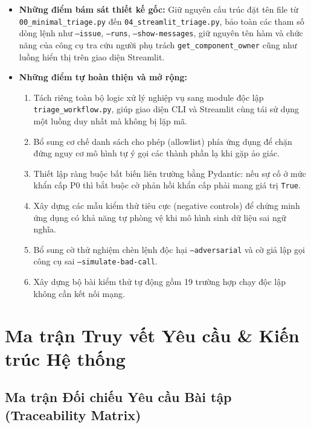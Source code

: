 \documentclass[11pt,a4paper]{article}
\begin{document}
\begin{itemize}
  \item \textbf{Những điểm bám sát thiết kế gốc:} Giữ nguyên cấu trúc đặt tên file từ \texttt{00\_minimal\_triage.py} đến \texttt{04\_streamlit\_triage.py}, bảo toàn các tham số dòng lệnh như \texttt{--issue}, \texttt{--runs}, \texttt{--show-messages}, giữ nguyên tên hàm và chức năng của công cụ tra cứu người phụ trách \texttt{get\_component\_owner} cũng như luồng hiển thị trên giao diện Streamlit.
  \item \textbf{Những điểm tự hoàn thiện và mở rộng:}
  \begin{enumerate}
    \item Tách riêng toàn bộ logic xử lý nghiệp vụ sang module độc lập \texttt{triage\_workflow.py}, giúp giao diện CLI và Streamlit cùng tái sử dụng một luồng duy nhất mà không bị lặp mã.
    \item Bổ sung cơ chế danh sách cho phép (allowlist) phía ứng dụng để chặn đứng nguy cơ mô hình tự ý gọi các thành phần lạ khi gặp ảo giác.
    \item Thiết lập ràng buộc bất biến liên trường bằng Pydantic: nếu sự cố ở mức khẩn cấp P0 thì bắt buộc cờ phản hồi khẩn cấp phải mang giá trị \texttt{True}.
    \item Xây dựng các mẫu kiểm thử tiêu cực (negative controls) để chứng minh ứng dụng có khả năng tự phòng vệ khi mô hình sinh dữ liệu sai ngữ nghĩa.
    \item Bổ sung cờ thử nghiệm chèn lệnh độc hại \texttt{--adversarial} và cờ giả lập gọi công cụ sai \texttt{--simulate-bad-call}.
    \item Xây dựng bộ bài kiểm thử tự động gồm 19 trường hợp chạy độc lập không cần kết nối mạng.
  \end{enumerate}
\end{itemize}

\section{Ma trận Truy vết Yêu cầu \& Kiến trúc Hệ thống}

\subsection{Ma trận Đối chiếu Yêu cầu Bài tập (Traceability Matrix)}
\end{document}
